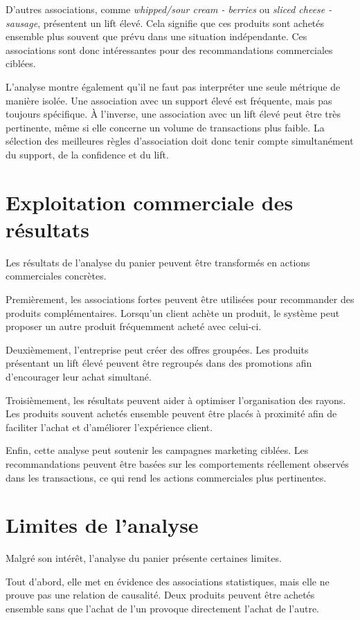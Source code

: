 \documentclass[12pt,a4paper,twoside]{report}
\begin{document}
D'autres associations, comme \textit{whipped/sour cream - berries} ou \textit{sliced cheese - sausage}, présentent un lift élevé. Cela signifie que ces produits sont achetés ensemble plus souvent que prévu dans une situation indépendante. Ces associations sont donc intéressantes pour des recommandations commerciales ciblées.

L'analyse montre également qu'il ne faut pas interpréter une seule métrique de manière isolée. Une association avec un support élevé est fréquente, mais pas toujours spécifique. À l'inverse, une association avec un lift élevé peut être très pertinente, même si elle concerne un volume de transactions plus faible. La sélection des meilleures règles d'association doit donc tenir compte simultanément du support, de la confidence et du lift.

\section{Exploitation commerciale des résultats}

Les résultats de l'analyse du panier peuvent être transformés en actions commerciales concrètes.

Premièrement, les associations fortes peuvent être utilisées pour recommander des produits complémentaires. Lorsqu'un client achète un produit, le système peut proposer un autre produit fréquemment acheté avec celui-ci.

Deuxièmement, l'entreprise peut créer des offres groupées. Les produits présentant un lift élevé peuvent être regroupés dans des promotions afin d'encourager leur achat simultané.

Troisièmement, les résultats peuvent aider à optimiser l'organisation des rayons. Les produits souvent achetés ensemble peuvent être placés à proximité afin de faciliter l'achat et d'améliorer l'expérience client.

Enfin, cette analyse peut soutenir les campagnes marketing ciblées. Les recommandations peuvent être basées sur les comportements réellement observés dans les transactions, ce qui rend les actions commerciales plus pertinentes.

\section{Limites de l'analyse}

Malgré son intérêt, l'analyse du panier présente certaines limites.

Tout d'abord, elle met en évidence des associations statistiques, mais elle ne prouve pas une relation de causalité. Deux produits peuvent être achetés ensemble sans que l'achat de l'un provoque directement l'achat de l'autre.
\end{document}
